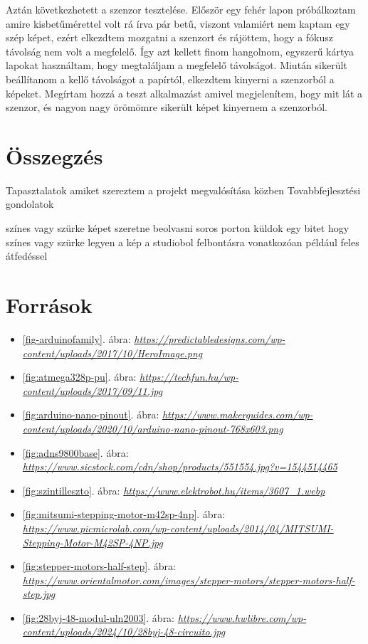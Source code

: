 \documentclass[]{thesis-ekf}
\theoremstyle{definition}
\theoremstyle{remark}
\begin{document}
Aztán következhetett a szenzor tesztelése. Először egy fehér lapon próbálkoztam amire kisbetűmérettel volt rá írva pár betű, viszont valamiért nem kaptam egy szép képet, ezért elkezdtem mozgatni a szenzort és rájöttem, hogy a fókusz távolság nem volt a megfelelő. Így azt kellett finom hangolnom, egyszerű kártya lapokat használtam, hogy megtaláljam a megfelelő távolságot. Miután sikerült beállítanom a kellő távolságot a papírtól, elkezdtem kinyerni a szenzorból a képeket. Megírtam hozzá a teszt alkalmazást amivel megjelenítem, hogy mit lát a szenzor, és nagyon nagy örömömre sikerült képet kinyernem a szenzorból.
\chapter*{Összegzés}
Tapasztalatok amiket szereztem a projekt megvalósítása közben
Tovabbfejlesztési gondolatok

színes vagy szürke képet szeretne beolvasni
soros porton küldok egy bitet hogy színes vagy szürke legyen a kép a studiobol
felbontásra vonatkozóan például  feles átfedéssel 
\chapter*{Források}
\begin{itemize}
	\item \ref{fig-arduinofamily}. ábra: \emph{\url{https://predictabledesigns.com/wp-content/uploads/2017/10/HeroImage.png}}
	\item \ref{fig:atmega328p-pu}. ábra: \emph{\url{https://techfun.hu/wp-content/uploads/2017/09/11.jpg}}
	\item \ref{fig:arduino-nano-pinout}. ábra: \emph{\url{https://www.makerguides.com/wp-content/uploads/2020/10/arduino-nano-pinout-768x603.png}}
	\item \ref{fig:adns9800base}. ábra: \emph{\url{https://www.sicstock.com/cdn/shop/products/551554.jpg?v=1544514465}}
	\item \ref{fig:szintilleszto}. ábra: \emph{\url{https://www.elektrobot.hu/items/3607_1.webp}}
	\item \ref{fig:mitsumi-stepping-motor-m42sp-4np}. ábra: \emph{\url{https://www.picmicrolab.com/wp-content/uploads/2014/04/MITSUMI-Stepping-Motor-M42SP-4NP.jpg}}
	\item \ref{fig:stepper-motors-half-step}. ábra: \emph{\url{https://www.orientalmotor.com/images/stepper-motors/stepper-motors-half-step.jpg}}
	\item \ref{fig:28byj-48-modul-uln2003}. ábra: \emph{\url{https://www.hwlibre.com/wp-content/uploads/2024/10/28byj-48-circuito.jpg}}
\end{itemize}
\end{document}
